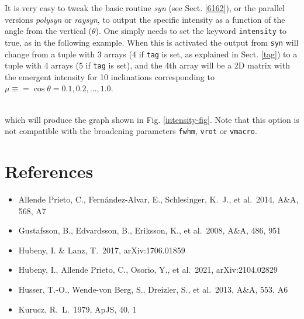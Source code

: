 \documentclass[]{article}
\begin{document}
It is very easy to tweak the basic routine {\it syn} (see Sect. \ref{6162}), or the parallel versions {\it polysyn} or {\it raysyn}, to output the specific intensity as a function of the angle from the vertical ($\theta$). One simply needs to set the keyword {\tt intensity} to true, as in the following example. When this is activated the output from {\tt syn} will change from a tuple with 3 arrays (4 if {\tt tag} is set, as explained in Sect. \ref{tag}) to a tuple with 4 arrays (5 if {\tt tag} is set), and the 4th array will be a 2D matrix with the emergent intensity for 10 inclinations corresponding to $\mu \equiv = \cos \theta = 0.1, 0.2, \dots, 1.0$.
\\
\\

\noindent which will produce the graph shown in Fig. \ref{intensity-fig}. Note that this option is not compatible with the broadening parameters {\tt fwhm}, {\tt vrot} or {\tt vmacro}.


\section{References}

\begin{itemize}
\item Allende Prieto, C., Fern{\'a}ndez-Alvar, E., Schlesinger, K.~J., et al.\ 2014, A\&A, 568, A7 
\item Gustafsson, B., Edvardsson, B., Eriksson, K., et al.\ 2008, A\&A, 486, 951
\item Hubeny, I. \& Lanz, T.\ 2017, arXiv:1706.01859
\item Hubeny, I., Allende Prieto, C., Osorio, Y., et al.\ 2021, arXiv:2104.02829
\item Husser, T.-O., Wende-von Berg, S., Dreizler, S., et al.\ 2013, A\&A, 553, A6
\item Kurucz, R.~L.\ 1979, ApJS, 40, 1

\end{itemize}
\end{document}
